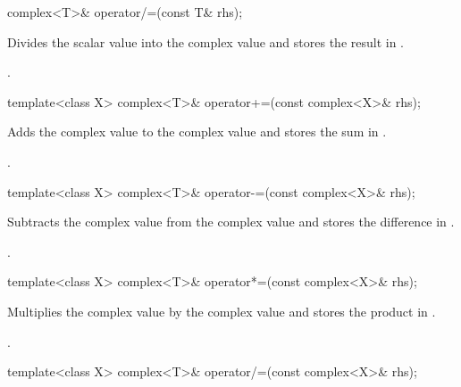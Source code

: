 %
\begin{itemdecl}
complex<T>& operator/=(const T& rhs);
\end{itemdecl}

\begin{itemdescr}
\pnum
\effects
Divides the scalar value  into the complex value
and stores the result in
.

\pnum
\returns
{}.
\end{itemdescr}

%
\begin{itemdecl}
template<class X> complex<T>& operator+=(const complex<X>& rhs);
\end{itemdecl}

\begin{itemdescr}
\pnum
\effects
Adds the complex value  to the complex value
and stores the sum in
.

\pnum
\returns
{}.
\end{itemdescr}

%
\begin{itemdecl}
template<class X> complex<T>& operator-=(const complex<X>& rhs);
\end{itemdecl}

\begin{itemdescr}
\pnum
\effects
Subtracts the complex value  from the complex value
and stores the difference in
.

\pnum
\returns
{}.
\end{itemdescr}

%
\begin{itemdecl}
template<class X> complex<T>& operator*=(const complex<X>& rhs);
\end{itemdecl}

\begin{itemdescr}
\pnum
\effects
Multiplies the complex value  by the complex value
and stores the product in
.

\returns
{}.
\end{itemdescr}

%
\begin{itemdecl}
template<class X> complex<T>& operator/=(const complex<X>& rhs);
\end{itemdecl}

